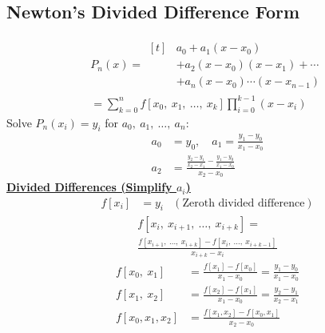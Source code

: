 \documentclass{article}
\begin{document}
\begin{multicols}{3}
    \subsection{Newton's Divided Difference Form}
    \begin{multline*}
        P_n\left( x \right) = \begin{aligned}[t]
             & a_0 + a_1 \left( x - x_0 \right)                                 \\
             & + a_2 \left( x - x_0 \right) \left( x - x_1 \right) + \cdots     \\
             & + a_n \left( x - x_0 \right) \cdots \left( x - x_{n - 1} \right)
        \end{aligned} \\
        = \sum_{k = 0}^n f\left[ x_0,\: x_1,\: \dots,\: x_k \right] \prod_{i = 0}^{k - 1} \left( x - x_i \right)
    \end{multline*}
    Solve \(P_n\left( x_i \right) = y_i\) for \(a_0,\: a_1,\: \dots,\: a_n\):
    \begin{align*}
        a_0 & = y_0, \quad a_1 = \frac{y_1 - y_0}{x_1 - x_0}                                \\
        a_2 & = \frac{\frac{y_2 - y_1}{x_2 - x_1} - \frac{y_1 - y_0}{x_1 - x_0}}{x_2 - x_0}
    \end{align*}
    \underline{\textbf{Divided Differences (Simplify \(a_i\))}}
    \begin{align*}
        f\left[ x_i \right] & = y_i & (\text{Zeroth divided difference})
    \end{align*}
    \begin{multline*}
        f\left[ x_i,\: x_{i + 1},\: \dots,\: x_{i + k} \right] = \\
        \frac{f\left[ x_{i + 1},\: \dots,\: x_{i + k} \right] - f\left[ x_i,\: \dots,\: x_{i + k - 1} \right]}{x_{i + k} - x_i}
    \end{multline*}
    \begin{align*}
        f\left[ x_0,\: x_1 \right]    & = \frac{f\left[ x_1 \right] - f\left[ x_0 \right]}{x_1 - x_0} = \frac{y_1 - y_0}{x_1 - x_0} \\
        f\left[ x_1,\: x_2 \right]    & = \frac{f\left[ x_2 \right] - f\left[ x_1 \right]}{x_1 - x_0} = \frac{y_2 - y_1}{x_2 - x_1} \\
        f\left[ x_0, x_1, x_2 \right] & = \frac{f\left[ x_1, x_2 \right] - f\left[ x_0, x_1 \right]}{x_2 - x_0}
    \end{align*}

\end{multicols}
\end{document}
